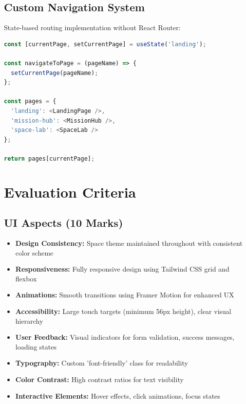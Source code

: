 \documentclass[12pt,a4paper]{article}
\begin{document}
\subsection{Custom Navigation System}
State-based routing implementation without React Router:
\begin{lstlisting}[language=JavaScript]
const [currentPage, setCurrentPage] = useState('landing');

const navigateToPage = (pageName) => {
  setCurrentPage(pageName);
};

const pages = {
  'landing': <LandingPage />,
  'mission-hub': <MissionHub />,
  'space-lab': <SpaceLab />
};

return pages[currentPage];
\end{lstlisting}

\newpage

\section{Evaluation Criteria}

\subsection{UI Aspects (10 Marks)}
\begin{itemize}
    \item \textbf{Design Consistency:} Space theme maintained throughout with consistent color scheme
    \item \textbf{Responsiveness:} Fully responsive design using Tailwind CSS grid and flexbox
    \item \textbf{Animations:} Smooth transitions using Framer Motion for enhanced UX
    \item \textbf{Accessibility:} Large touch targets (minimum 56px height), clear visual hierarchy
    \item \textbf{User Feedback:} Visual indicators for form validation, success messages, loading states
    \item \textbf{Typography:} Custom 'font-friendly' class for readability
    \item \textbf{Color Contrast:} High contrast ratios for text visibility
    \item \textbf{Interactive Elements:} Hover effects, click animations, focus states
\end{itemize}
\end{document}

